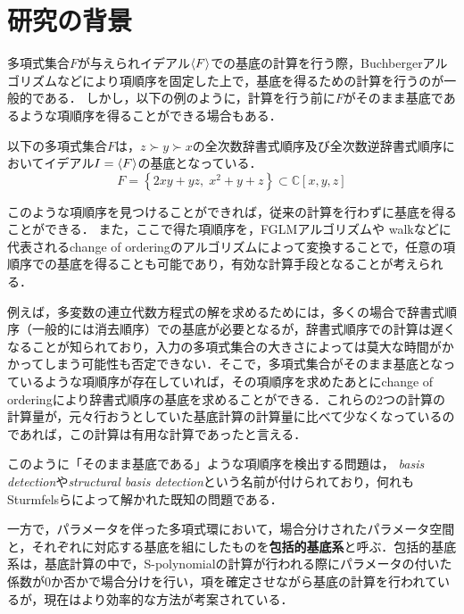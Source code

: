 \section{研究の背景}
多項式集合$F$が与えられイデアル$\langle F \rangle$での\groebner{}基底の計算を行う際，Buchbergerアルゴリズム\cite{buchberger2006bruno}などにより項順序を固定した上で，\groebner{}基底を得るための計算を行うのが一般的である．
しかし，以下の例のように，計算を行う前に$F$がそのまま\groebner{}基底であるような項順序を得ることができる場合もある．
\begin{example}
	以下の多項式集合$F$は，$z \succ y \succ x$の全次数辞書式順序及び全次数逆辞書式順序においてイデアル$I = \langle F \rangle$の\groebner{}基底となっている．
	$$F = \left\{ 2xy + yz, \; x^2 + y + z \right\} \subset \mathbb{C}[x, y, z]$$
\end{example}
このような項順序を見つけることができれば，従来の計算を行わずに\groebner{}基底を得ることができる．
また，ここで得た項順序を，FGLMアルゴリズム\cite{faugere1993efficient}や\groebner{} walk\cite{collart1993grobner}などに代表されるchange of orderingのアルゴリズムによって変換することで，任意の項順序での\groebner{}基底を得ることも可能であり，有効な計算手段となることが考えられる．
\par
例えば，多変数の連立代数方程式の解を求めるためには，多くの場合で辞書式順序（一般的には消去順序）での\groebner{}基底が必要となるが，辞書式順序での計算は遅くなることが知られており，入力の多項式集合の大きさによっては莫大な時間がかかってしまう可能性も否定できない．そこで，多項式集合がそのまま\groebner{}基底となっているような項順序が存在していれば，その項順序を求めたあとにchange of orderingにより辞書式順序の\groebner{}基底を求めることができる．これらの$2$つの計算の計算量が，元々行おうとしていた\groebner{}基底計算の計算量に比べて少なくなっているのであれば，この計算は有用な計算であったと言える．
\par
このように「そのまま\groebner{}基底である」ような項順序を検出する問題は，\emph{\groebner{} basis detection}\cite{gritzmann1993minkowski}や\emph{structural \groebner{} basis detection}\cite{sturmfels1997structural}という名前が付けられており，何れもSturmfelsらによって解かれた既知の問題である．
\par
一方で，パラメータを伴った多項式環において，場合分けされたパラメータ空間と，それぞれに対応する\groebner{}基底を組にしたものを\textbf{包括的\groebner{}基底系}\cite{weispfenning1992comprehensive}と呼ぶ．包括的\groebner{}基底系は，\groebner{}基底計算の中で，\textrm{S-polynomial}の計算が行われる際にパラメータの付いた係数が$0$か否かで場合分けを行い，項を確定させながら\groebner{}基底の計算を行われているが，現在はより効率的な方法が考案されている\cite{kapur2010new}．

